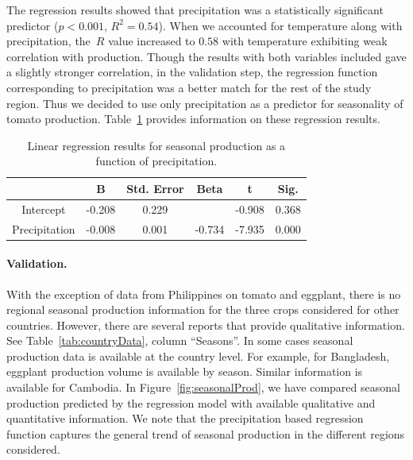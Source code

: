 \documentclass[10pt]{article}
\theoremstyle{definition}
\begin{document}
The regression results showed that precipitation was a statistically
significant predictor ($p <0.001$, $R^2=0.54$). When we accounted for
temperature along with precipitation, the~$R$ value increased to $0.58$
with temperature exhibiting weak correlation with production.  Though the
results with both variables included gave a slightly stronger correlation,
in the validation step, the regression function corresponding to
precipitation was a better match for the rest of the study region. Thus we
decided to use only precipitation as a predictor for seasonality of tomato
production. Table~\ref{fig:regression} provides information on these
regression results.

\begin{table}[!ht]
    \centering
	\small
    \caption{Linear regression results for seasonal production as a
        function of precipitation.
        \label{fig:regression}}
    \begin{tabular}{c c c c c c}
		\hline	 	
		 & B & Std. Error & Beta & t & Sig.  \\
		\hline		
		\hline
        Intercept & -0.208 & 0.229 & & -0.908 & 0.368 \\
        \hline
        Precipitation & -0.008 & 0.001 & -0.734 & -7.935 & 0.000 \\
    \end{tabular}
\end{table}

\paragraph{Validation.} With the exception of data from Philippines on
tomato and eggplant, there is no regional seasonal production information
for the three crops considered for other countries.  However, there are
several reports that provide qualitative information. See
Table~\ref{tab:countryData}, column ``Seasons''. In some cases seasonal
production data is available at the country level. For example, for
Bangladesh, eggplant production volume is available by season. Similar
information is available for Cambodia. In Figure~\ref{fig:seasonalProd}, we
have compared seasonal production predicted by the regression model with available
qualitative and quantitative information. We note that the precipitation
based regression function captures the general trend of seasonal production
in the different regions considered.
\end{document}
